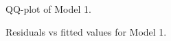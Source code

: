 \documentclass[review,12pt,authoryear]{elsarticle}
\begin{document}
\begin{linenumbers}
\begin{figure}
  \caption{QQ-plot of Model 1.}
\end{figure}

\begin{figure}
  \caption{Residuals vs fitted values for Model 1.}
\end{figure}


\end{linenumbers}
\end{document}
